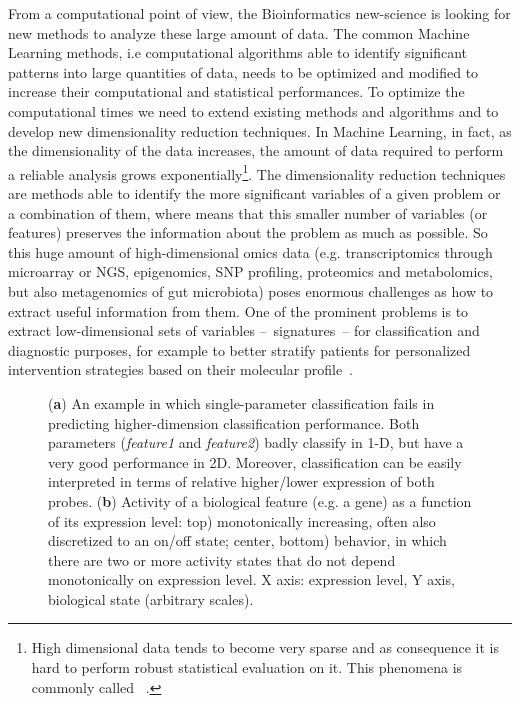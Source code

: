 \documentclass{standalone}
\begin{document}
From a computational point of view, the Bioinformatics new-science is looking for new methods to analyze these large amount of data.
The common Machine Learning methods, i.e computational algorithms able to identify significant patterns into large quantities of data, needs to be optimized and modified to increase their computational and statistical performances.
To optimize the computational times we need to extend existing methods and algorithms and to develop new dimensionality reduction techniques.
In Machine Learning, in fact, as the dimensionality of the data increases, the amount of data required to perform a reliable analysis grows exponentially\footnote{
  High dimensional data tends to become very sparse and as consequence it is hard to perform robust statistical evaluation on it.
  This phenomena is commonly called ~\cite{bellman1961adaptive}.
}.
The dimensionality reduction techniques are methods able to identify the more significant variables of a given problem or a combination of them, where  means that this smaller number of variables (or features) preserves the information about the problem as much as possible.
So this huge amount of high-dimensional omics data (e.g. transcriptomics through microarray or NGS, epigenomics, SNP profiling, proteomics and metabolomics, but also metagenomics of gut microbiota) poses enormous challenges as how to extract useful information from them.
One of the prominent problems is to extract low-dimensional sets of variables –~signatures~– for classification and diagnostic purposes, for example to better stratify patients for personalized intervention strategies based on their molecular profile~\cite{Scotlandi2009, Chan2011, Johnson2017, Beckmann2016ReconcilingEM}.


\begin{figure}[htbp]
\centering
\def\svgwidth{0.4\textwidth}

\qquad\qquad
\def\svgwidth{0.4\textwidth}

\caption{(\textbf{a}) An example in which single-parameter classification fails in predicting higher-dimension classification performance.
Both parameters (\emph{feature1} and \emph{feature2}) badly classify in 1-D, but have a very good performance in 2D.
Moreover, classification can be easily interpreted in terms of relative higher/lower expression of both probes.
(\textbf{b}) Activity of a biological feature (e.g. a gene) as a function of its expression level:
top) monotonically increasing, often also discretized to an on/off state;
center, bottom)  behavior, in which there are two or more activity states that do not depend monotonically on expression level.
X axis: expression level, Y axis, biological state (arbitrary scales).
}
\label{fig:example}
\end{figure}
\end{document}
